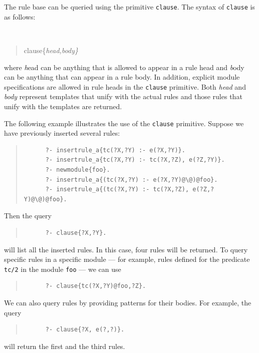 \documentclass[11pt]{article}
\begin{document}
The rule base can be queried using the primitive {\tt clause}.  The
syntax of {\tt clause} is as follows:

{\tt
\begin{quote}
clause\{\it{head,body}\}
\end{quote}
}
\noindent
where {\emph head} can be anything that is allowed to appear in a rule
head and {\emph body} can be anything that
can appear in a rule body. In addition, explicit module specifications are
allowed in rule heads in the {\tt clause} primitive. 
Both \emph{head} and \emph{body} represent
templates that unify with the actual rules and those rules that unify
with the templates are returned.

The following example illustrates the use of the {\tt clause} primitive.
Suppose we have previously inserted several rules:
\begin{quote}
\begin{verbatim}
      ?- insertrule_a{tc(?X,?Y) :- e(?X,?Y)}.
      ?- insertrule_a{tc(?X,?Y) :- tc(?X,?Z), e(?Z,?Y)}.
      ?- newmodule{foo}.
      ?- insertrule_a{(tc(?X,?Y) :- e(?X,?Y)@\@)@foo}.
      ?- insertrule_a{(tc(?X,?Y) :- tc(?X,?Z), e(?Z,?Y)@\@)@foo}.
\end{verbatim}
\end{quote}

Then the query
\begin{quote}
\begin{verbatim}
      ?- clause{?X,?Y}.
\end{verbatim}
\end{quote}
\noindent
will list all the inserted rules.  In this case, four rules will be
returned.  To query specific rules in a specific module --- for example,
rules defined for the predicate {\tt tc/2} in the module {\tt foo} --- we
can use
\begin{quote}
\begin{verbatim}
      ?- clause{tc(?X,?Y)@foo,?Z}.
\end{verbatim}
\end{quote}
We can also query rules by providing patterns for their bodies. For
example, the query
\begin{quote}
\begin{verbatim}
      ?- clause{?X, e(?,?)}.
\end{verbatim}
\end{quote}
\noindent
will return the first and the third rules.
\end{document}
